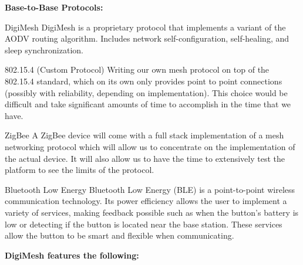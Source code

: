 \documentclass[journal,compsoc]{IEEEtran}
\begin{document}
\noindent \textbf {Base-to-Base Protocols:}\\

\begin{LaTeXdescription}
  \item [DigiMesh] DigiMesh is a proprietary protocol that implements a variant of the AODV routing algorithm. Includes network self-configuration, self-healing, and sleep synchronization.\\
  \item [802.15.4  (Custom Protocol)] Writing our own mesh protocol on top of the 802.15.4 standard, which on its own only provides point to point connections (possibly with reliability, depending on implementation). This choice would be difficult and take significant amounts of time to accomplish in the time that we have.\\
  \item [ZigBee] A ZigBee device will come with a full stack implementation of a mesh networking protocol which will allow us to concentrate on the implementation of the actual device. It will also allow us to have the time to extensively test the platform to see the limits of the protocol.\\
  \item [Bluetooth Low Energy] Bluetooth Low Energy (BLE) is a point-to-point wireless communication technology.  Its power efficiency allows the user to implement a variety of services, making feedback possible such as when the button’s battery is low or detecting if the button is located near the base station.  These services allow the button to be smart and flexible when communicating.\\
\end{LaTeXdescription}

\textbf {DigiMesh features the following:}
\end{document}
